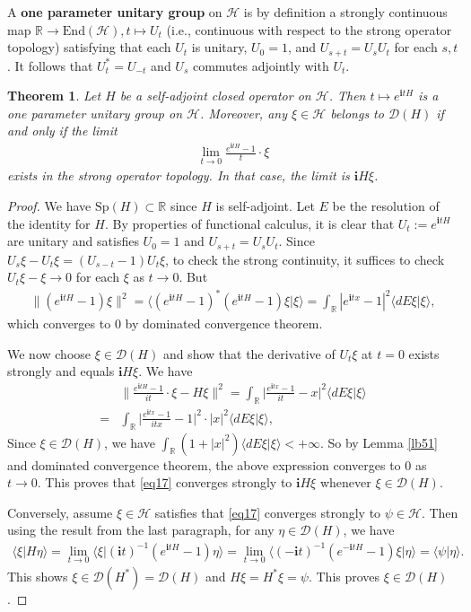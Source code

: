 \documentclass[12pt,b5paper,notitlepage]{article}
\theoremstyle{definition}
\theoremstyle{plain}
\newtheorem{thm}[df]{Theorem}
\newcommand{\mc}{\mathcal}
\newcommand{\End}{\mathrm{End}} %
\newcommand{\Dom}{\scr D}
\newcommand{\bk}[1]{\langle {#1}\rangle}
\newcommand{\scr}{\mathscr}
\newcommand{\im}{\mathbf{i}}
\newcommand{\Rbb}{\mathbb R}
\newcommand{\Sp}{\mathrm{Sp}}
\numberwithin{equation}{section}
\begin{document}
A \textbf{one parameter unitary group} on $\mc H$ is by definition a strongly continuous map $\Rbb\rightarrow\End(\mc H),t\mapsto U_t$ (i.e., continuous with respect to the strong operator topology) satisfying that each $U_t$ is unitary, $U_0=1$, and $U_{s+t}=U_sU_t$ for each $s,t$. It follows that $U_t^*=U_{-t}$ and $U_s$ commutes adjointly with $U_t$.


\begin{thm}
Let $H$ be a self-adjoint closed operator on $\mc H$. Then $t\mapsto e^{\im tH}$ is a one parameter unitary group on $\mc H$. Moreover, any $\xi\in\mc H$ belongs to $\Dom(H)$ if and only if the limit
\begin{align}
\lim_{t\rightarrow 0}\frac{e^{\im tH}-1}{t}\cdot \xi\label{eq17}	
\end{align}
exists in the strong operator topology. In that case, the limit is $\im H\xi$.
\end{thm}


\begin{proof}
We have $\Sp(H)\subset\Rbb$ since $H$ is self-adjoint. Let $E$ be the resolution of the identity for $H$. By properties of functional calculus, it is clear that $U_t:=e^{\im tH}$ are unitary and satisfies $U_0=1$ and $U_{s+t}=U_sU_t$. Since $U_s\xi-U_t\xi=(U_{s-t}-1)U_t\xi$, to check the strong continuity, it suffices to check $U_t\xi-\xi\rightarrow 0$ for each $\xi$ as $t\rightarrow 0$. But
\begin{align*}
\lVert (e^{\im tH}-1)\xi\lVert^2=\bk{(e^{\im tH}-1)^*(e^{\im tH}-1)\xi|\xi}=\int_\Rbb |e^{\im tx}-1|^2\bk{dE\xi|\xi},
\end{align*}
which converges to $0$ by dominated convergence theorem.

We now choose $\xi\in\Dom(H)$ and show that the derivative of $U_t\xi$ at $t=0$ exists strongly and equals $\im H\xi$. We have
\begin{align}
&\Big\lVert \frac{e^{\im tH}-1}{it}\cdot \xi-H\xi  \Big\lVert^2=\int_\Rbb \Big|\frac{e^{\im tx}-1}{it}-x  \Big|^2\bk{dE\xi|\xi}\nonumber\\
=&	\int_\Rbb \Big|\frac{e^{\im tx}-1}{itx}-1  \Big|^2\cdot |x|^2\bk{dE\xi|\xi},\nonumber
\end{align}
Since $\xi\in\Dom(H)$, we have $\int_\Rbb (1+|x|^2)\bk{dE\xi|\xi}<+\infty$. So by Lemma \ref{lb51} and dominated convergence theorem, the above expression converges to $0$ as $t\rightarrow 0$. This proves that \eqref{eq17} converges strongly to $\im H\xi$ whenever $\xi\in\Dom(H)$.

Conversely, assume $\xi\in\mc H$ satisfies that \eqref{eq17} converges strongly to $\psi\in\mc H$. Then using the result from the last paragraph, for any $\eta\in\Dom(H)$, we have
\begin{align}
\bk{\xi|H\eta}=\lim_{t\rightarrow 0}\bk{\xi|(\im t)^{-1}(e^{\im tH}-1)\eta}=\lim_{t\rightarrow 0}\bk{(-\im t)^{-1}(e^{-\im tH}-1)\xi|\eta}=\bk{\psi|\eta}.	\label{eq18}
\end{align}
This shows $\xi\in\Dom(H^*)=\Dom(H)$ and $H\xi=H^*\xi=\psi$. This proves $\xi\in\Dom(H)$.
\end{proof}
\end{document}
